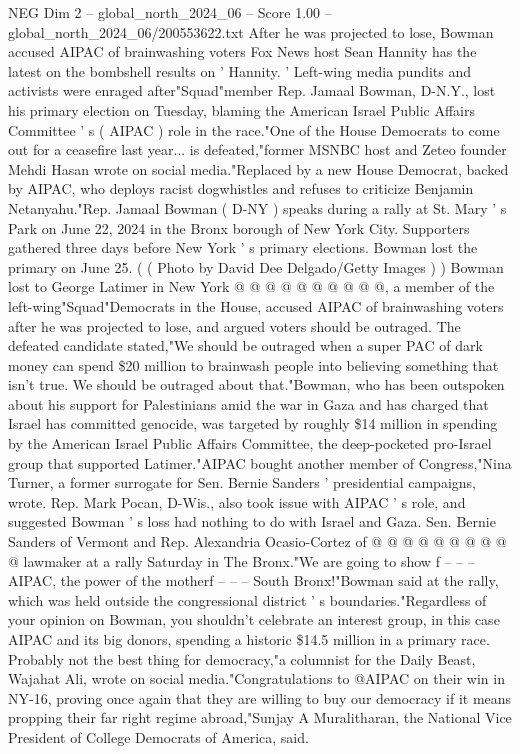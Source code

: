 \begin{textsample}{NEG Dim 2 – global\_north\_2024\_06 – Score 1.00 – global\_north\_2024\_06/200553622.txt}  \label{ex:f2_neg_127}
After he was projected to lose, Bowman accused AIPAC of brainwashing voters Fox News host Sean Hannity has the latest on the bombshell results on ' Hannity. ' Left-wing media pundits and activists were enraged after"Squad"member Rep.
Jamaal Bowman, D-N.Y., lost his primary election on Tuesday, blaming the American Israel Public Affairs Committee ' s ( AIPAC ) role in the race."One of the House Democrats to come out for a ceasefire last year... is defeated,"former MSNBC host and Zeteo founder Mehdi Hasan wrote on social media."Replaced by a new House Democrat, backed by AIPAC, who deploys racist dogwhistles and refuses to criticize Benjamin Netanyahu."Rep.
Jamaal Bowman ( D-NY ) speaks during a rally at St.
Mary ' s Park on June 22, 2024 in the Bronx borough of New York City.
Supporters gathered three days before New York ' s primary elections.
Bowman lost the primary on June 25. ( ( Photo by David Dee Delgado/Getty Images ) ) Bowman lost to George Latimer in New York @ @ @ @ @ @ @ @ @ @, a member of the left-wing"Squad"Democrats in the House, accused AIPAC of brainwashing voters after he was projected to lose, and argued voters should be outraged.
The defeated candidate stated,"We should be outraged when a super PAC of dark money can spend \$20 million to brainwash people into believing something that isn't true.
We should be outraged about that."Bowman, who has been outspoken about his support for Palestinians amid the war in Gaza and has charged that Israel has committed genocide, was targeted by roughly \$14 million in spending by the American Israel Public Affairs Committee, the deep-pocketed pro-Israel group that supported Latimer."AIPAC bought another member of Congress,"Nina Turner, a former surrogate for Sen.
Bernie Sanders ' presidential campaigns, wrote.
Rep.
Mark Pocan, D-Wis., also took issue with AIPAC ' s role, and suggested Bowman ' s loss had nothing to do with Israel and Gaza.
Sen.
Bernie Sanders of Vermont and Rep.
Alexandria Ocasio-Cortez of @ @ @ @ @ @ @ @ @ @ lawmaker at a rally Saturday in The Bronx."We are going to show f -- -- -- AIPAC, the power of the motherf -- -- -- South Bronx!"Bowman said at the rally, which was held outside the congressional district ' s boundaries."Regardless of your opinion on Bowman, you shouldn't celebrate an interest group, in this case AIPAC and its big donors, spending a historic \$14.5 million in a primary race.
Probably not the best thing for democracy,"a columnist for the Daily Beast, Wajahat Ali, wrote on social media."Congratulations to @AIPAC on their win in NY-16, proving once again that they are willing to buy our democracy if it means propping their far right regime abroad,"Sunjay A Muralitharan, the National Vice President of College Democrats of America, said.

\end{textsample}
